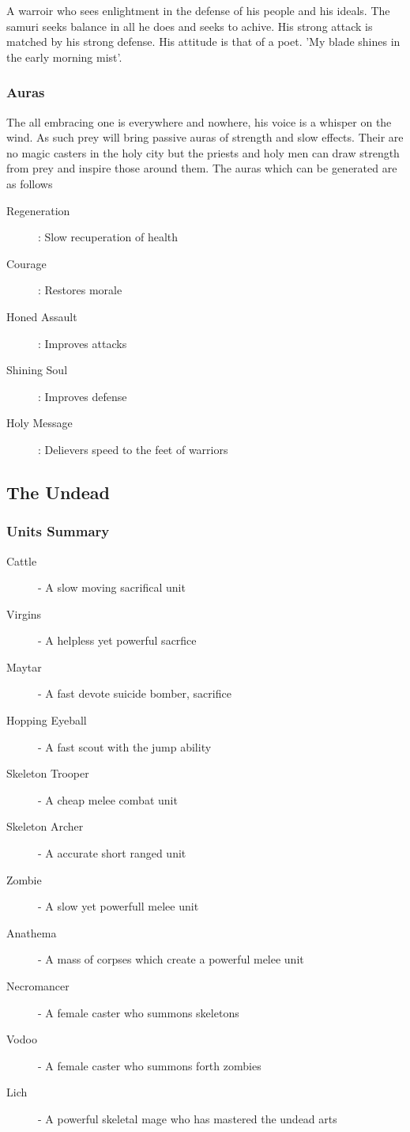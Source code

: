 \documentclass[a4paper,twocolumn]{article}
\begin{document}
A warroir who sees enlightment in the defense of his people and his ideals. The samuri seeks balance in all he does and seeks to achive. His strong attack is matched by his strong defense. His attitude is that of a poet. 'My blade shines in the early morning mist'.

\subsubsection{Auras}

The all embracing one is everywhere and nowhere, his voice is a whisper on the wind. As such prey will bring passive auras of strength and slow effects. Their are no magic casters in the holy city but the priests and holy men can draw strength from prey and inspire those around them.
The auras which can be generated are as follows
\begin{description}
\item [Regeneration]: Slow recuperation of health
\item [Courage]: Restores morale
\item [Honed Assault]: Improves attacks
\item [Shining Soul]: Improves defense
\item [Holy Message]: Delievers speed to the feet of warriors
\end{description}

\subsection{The Undead}

\subsubsection{Units Summary}
\begin{description}
\item [Cattle] - A slow moving sacrifical unit
\item [Virgins] - A helpless yet powerful sacrfice
\item [Maytar] - A fast devote suicide bomber, sacrifice

\item [Hopping Eyeball] - A fast scout with the jump ability

\item [Skeleton Trooper] - A cheap melee combat unit
\item [Skeleton Archer] - A accurate short ranged unit

\item [Zombie] - A slow yet powerfull melee unit
\item [Anathema] - A mass of corpses which create a powerful melee unit

\item [Necromancer] - A female caster who summons skeletons
\item [Vodoo] - A female caster who summons forth zombies
\item [Lich] - A powerful skeletal mage who has mastered the undead arts
\end{description}
\end{document}
